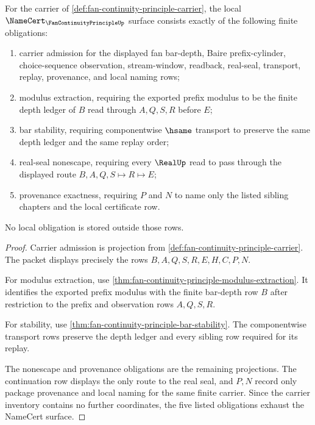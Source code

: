 \begin{theorem}
\label{thm:fan-continuity-principle-namecert}
For the carrier of \autoref{def:fan-continuity-principle-carrier}, the local $\NameCert_{\FanContinuityPrincipleUp}$ surface consists exactly of the following finite obligations:
\begin{enumerate}
\item carrier admission for the displayed fan bar-depth, Baire prefix-cylinder, choice-sequence observation, stream-window, readback, real-seal, transport, replay, provenance, and local naming rows;
\item modulus extraction, requiring the exported prefix modulus to be the finite depth ledger of $B$ read through $A,Q,S,R$ before $E$;
\item bar stability, requiring componentwise $\hsame$ transport to preserve the same depth ledger and the same replay order;
\item real-seal nonescape, requiring every $\RealUp$ read to pass through the displayed route $B,A,Q,S \longmapsto R \longmapsto E$;
\item provenance exactness, requiring $P$ and $N$ to name only the listed sibling chapters and the local certificate row.
\end{enumerate}
No local obligation is stored outside those rows.
\end{theorem}
\begin{proof}
Carrier admission is projection from \autoref{def:fan-continuity-principle-carrier}. The packet displays precisely the rows $B,A,Q,S,R,E,H,C,P,N$.

For modulus extraction, use \autoref{thm:fan-continuity-principle-modulus-extraction}. It identifies the exported prefix modulus with the finite bar-depth row $B$ after restriction to the prefix and observation rows $A,Q,S,R$.

For stability, use \autoref{thm:fan-continuity-principle-bar-stability}. The componentwise transport rows preserve the depth ledger and every sibling row required for its replay.

The nonescape and provenance obligations are the remaining projections. The continuation row displays the only route to the real seal, and $P,N$ record only package provenance and local naming for the same finite carrier. Since the carrier inventory contains no further coordinates, the five listed obligations exhaust the NameCert surface.
\end{proof}

